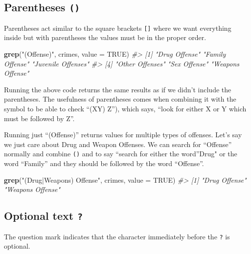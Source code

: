 \documentclass[
  12pt,
]{book}
\newenvironment{Shaded}{\begin{snugshade}}{\end{snugshade}}
\newcommand{\CommentTok}[1]{\textcolor[rgb]{0.56,0.35,0.01}{\textit{#1}}}
\newcommand{\DataTypeTok}[1]{\textcolor[rgb]{0.13,0.29,0.53}{#1}}
\newcommand{\KeywordTok}[1]{\textcolor[rgb]{0.13,0.29,0.53}{\textbf{#1}}}
\newcommand{\NormalTok}[1]{#1}
\newcommand{\OtherTok}[1]{\textcolor[rgb]{0.56,0.35,0.01}{#1}}
\newcommand{\StringTok}[1]{\textcolor[rgb]{0.31,0.60,0.02}{#1}}
\begin{document}
\hypertarget{parentheses}{%
\subsection{\texorpdfstring{Parentheses \texttt{()}}{Parentheses ()}}\label{parentheses}}

Parentheses act similar to the square brackets \texttt{{[}{]}} where we want everything inside but with parentheses the values must be in the proper order.

\begin{Shaded}
\begin{Highlighting}[]
\KeywordTok{grep}\NormalTok{(}\StringTok{"(Offense)"}\NormalTok{, crimes, }\DataTypeTok{value =} \OtherTok{TRUE}\NormalTok{)}
\CommentTok{\#> [1] "Drug Offense"      "Family Offense"    "Juvenile Offenses"}
\CommentTok{\#> [4] "Other Offenses"    "Sex Offense"       "Weapons Offense"}
\end{Highlighting}
\end{Shaded}

Running the above code returns the same results as if we didn't include the parentheses. The usefulness of parentheses comes when combining it with the \texttt{\textbar{}} symbol to be able to check ``(X\textbar Y) Z''), which says, ``look for either X or Y which must be followed by Z''.

Running just ``(Offense)'' returns values for multiple types of offenses. Let's say we just care about Drug and Weapon Offenses. We can search for ``Offense'' normally and combine \texttt{()} and \texttt{\textbar{}} to say ``search for either the word''Drug" or the word ``Family'' and they should be followed by the word ``Offense''.

\begin{Shaded}
\begin{Highlighting}[]
\KeywordTok{grep}\NormalTok{(}\StringTok{"(Drug|Weapons) Offense"}\NormalTok{, crimes, }\DataTypeTok{value =} \OtherTok{TRUE}\NormalTok{)}
\CommentTok{\#> [1] "Drug Offense"    "Weapons Offense"}
\end{Highlighting}
\end{Shaded}

\hypertarget{optional-text}{%
\subsection{\texorpdfstring{Optional text \texttt{?}}{Optional text ?}}\label{optional-text}}

The question mark indicates that the character immediately before the \texttt{?} is optional.
\end{document}
